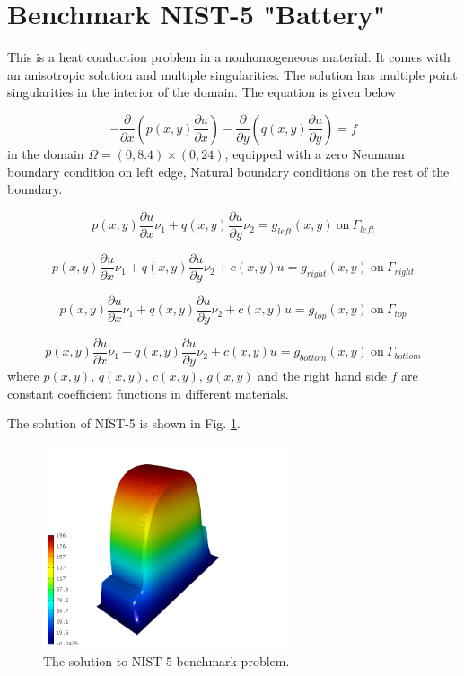 \documentclass[12pt]{elsarticle}
\begin{document}
\section{Benchmark NIST-5 "Battery"}
\label{sec:bench-5}

This is a heat conduction problem in a nonhomogeneous material. It comes with an anisotropic solution and
multiple singularities. The solution has multiple point singularities in the interior of the domain.
The equation is given below

\begin{equation} \label{heat-conduction}
-\frac{\partial }{\partial x}\left(p(x, y)\frac{\partial u}{\partial x}\right)
-\frac{\partial }{\partial y}\left(q(x, y)\frac{\partial u}{\partial y}\right) = f
\end{equation}
in the domain $\Omega = (0, 8.4) \times (0, 24)$, equipped with
a zero Neumann boundary condition on left edge, Natural boundary conditions on the rest of the boundary.

\begin{equation}
p(x, y)\frac{\partial u}{\partial x}\nu_1 + q(x, y)\frac{\partial u}{\partial y}\nu_2 = g_{left}(x, y) \ \mbox{on} \  \Gamma_{left}
\end{equation}

\begin{equation}
p(x, y)\frac{\partial u}{\partial x}\nu_1 + q(x, y)\frac{\partial u}{\partial y}\nu_2 + c(x, y)u = g_{right}(x, y) \ \mbox{on} \ \Gamma_{right}
\end{equation}

\begin{equation}
p(x, y)\frac{\partial u}{\partial x}\nu_1 + q(x, y)\frac{\partial u}{\partial y}\nu_2 + c(x, y)u = g_{top}(x, y) \ \mbox{on} \ \Gamma_{top}
\end{equation}

\begin{equation}
p(x, y)\frac{\partial u}{\partial x}\nu_1 + q(x, y)\frac{\partial u}{\partial y}\nu_2 + c(x, y)u = g_{bottom}(x, y) \ \mbox{on} \ \Gamma_{bottom}
\end{equation}
where $p(x, y)$, $q(x, y)$, $c(x, y)$, $g(x, y)$
and the right hand side $f$ are constant coefficient
functions in different materials.

The solution of NIST-5 is shown in Fig. \ref{fig:sln-nist05}.
\begin{figure}[!ht]
\centering
\includegraphics[height=6cm]{nist/nist-5/solution-3d.png}
\caption{The solution to NIST-5 benchmark problem.}
\label{fig:sln-nist05}
\end{figure}
\end{document}
